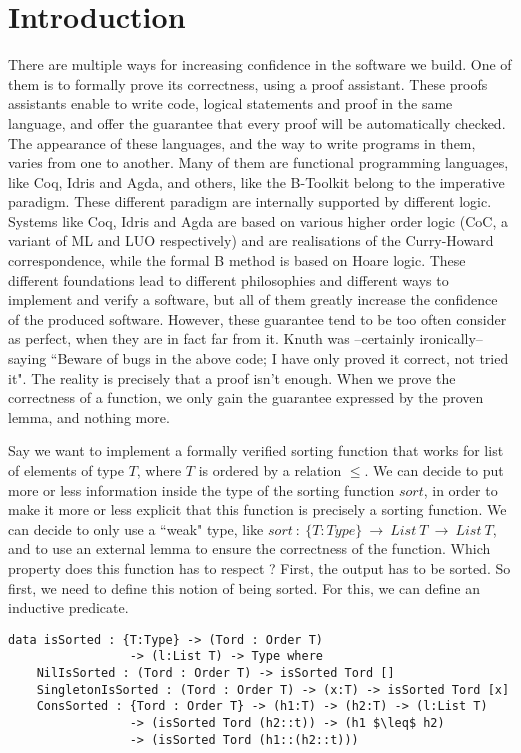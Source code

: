 	\section{Introduction}

There are multiple ways for increasing confidence in the software we build. One of them is to formally prove its correctness, using a proof assistant. These proofs assistants enable to write code, logical statements and proof in the same language, and offer the guarantee that every proof will be automatically checked. The appearance of these languages, and the way to write programs in them, varies from one to another. Many of them are functional programming languages, like Coq, Idris and Agda, and others, like the B-Toolkit belong to the imperative paradigm. These different paradigm are internally supported by different logic. Systems like Coq, Idris and Agda are based on various higher order logic (CoC, a variant of ML and LUO respectively) and are realisations of the Curry-Howard correspondence, while the formal B method is based on Hoare logic. These different foundations lead to different philosophies and different ways to implement and verify a software, but all of them greatly increase the confidence of the produced software. However, these guarantee tend to be too often consider as perfect, when they are in fact far from it. Knuth was --certainly ironically-- saying ``Beware of bugs in the above code; I have only proved it correct, not tried it". The reality is precisely that a proof isn't enough. When we prove the correctness of a function, we only gain the guarantee expressed by the proven lemma, and nothing more. 

Say we want to implement a formally verified sorting function that works for list of elements of type $T$, where $T$ is ordered by a relation $\leq$.
We can decide to put more or less information inside the type of the sorting function $sort$, in order to make it more or less explicit that this function is precisely a sorting function. We can decide to only use a ``weak" type, like $sort\ :\ \{T:Type\}\ \rightarrow\ List\ T\ \rightarrow\ List\ T$, and to use an external lemma to ensure the correctness of the function. Which property does this function has to respect ? First, the output has to be sorted. So first, we need to define this notion of being sorted. For this, we can define an inductive predicate.

\begin{lstlisting}
data isSorted : {T:Type} -> (Tord : Order T) 
                 -> (l:List T) -> Type where
    NilIsSorted : (Tord : Order T) -> isSorted Tord []
    SingletonIsSorted : (Tord : Order T) -> (x:T) -> isSorted Tord [x]
    ConsSorted : {Tord : Order T} -> (h1:T) -> (h2:T) -> (l:List T) 
                 -> (isSorted Tord (h2::t)) -> (h1 $\leq$ h2) 
                 -> (isSorted Tord (h1::(h2::t)))
\end{lstlisting}

